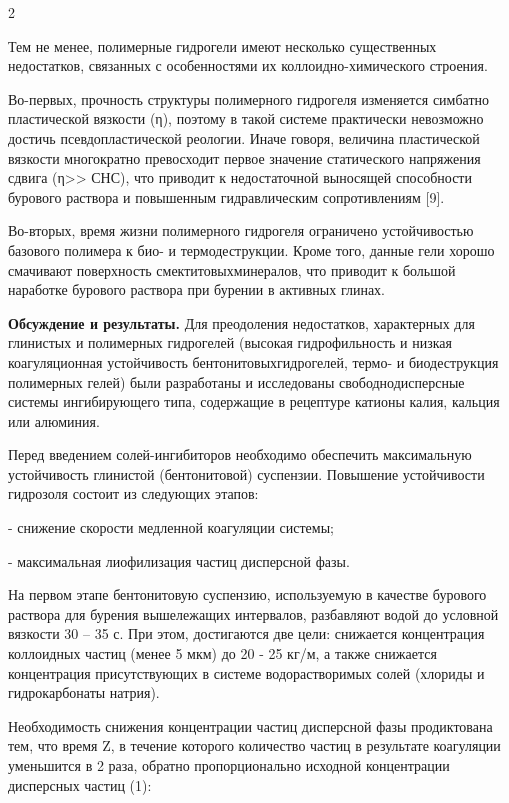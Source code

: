 \begin{multicols}{2}

Тем не менее, полимерные гидрогели имеют несколько существенных
недостатков, связанных с особенностями их коллоидно-химического
строения.

Во-первых, прочность структуры полимерного гидрогеля изменяется симбатно
пластической вязкости (η), поэтому в такой системе практически
невозможно достичь псевдопластической реологии. Иначе говоря, величина
пластической вязкости многократно превосходит первое значение
статического напряжения сдвига (η\textgreater\textgreater{}
СНС), что приводит к недостаточной выносящей
способности бурового раствора и повышенным гидравлическим сопротивлениям
{[}9{]}.

Во-вторых, время жизни полимерного гидрогеля ограничено устойчивостью
базового полимера к био- и термодеструкции. Кроме того, данные гели
хорошо смачивают поверхность смектитовыхминералов, что приводит к
большой наработке бурового раствора при бурении в активных глинах.

{\bfseries Обсуждение и результаты.} Для преодоления недостатков,
характерных для глинистых и полимерных гидрогелей (высокая
гидрофильность и низкая коагуляционная устойчивость
бентонитовыхгидрогелей, термо- и биодеструкция полимерных гелей) были
разработаны и исследованы свободнодисперсные системы ингибирующего типа,
содержащие в рецептуре катионы калия, кальция или алюминия.

Перед введением солей-ингибиторов необходимо обеспечить максимальную
устойчивость глинистой (бентонитовой) суспензии. Повышение устойчивости
гидрозоля состоит из следующих этапов:

- снижение скорости медленной коагуляции системы;

- максимальная лиофилизация частиц дисперсной фазы.

На первом этапе бентонитовую суспензию, используемую в качестве бурового
раствора для бурения вышележащих интервалов, разбавляют водой до
условной вязкости 30 -- 35 с. При этом, достигаются две цели: снижается
концентрация коллоидных частиц (менее 5 мкм) до 20 - 25
кг/м, а также снижается концентрация присутствующих в
системе водорастворимых солей (хлориды и гидрокарбонаты натрия).

Необходимость снижения концентрации частиц дисперсной фазы продиктована
тем, что время Z, в течение которого количество частиц в результате
коагуляции уменьшится в 2 раза, обратно пропорционально исходной
концентрации дисперсных частиц (1):


\end{multicols}
